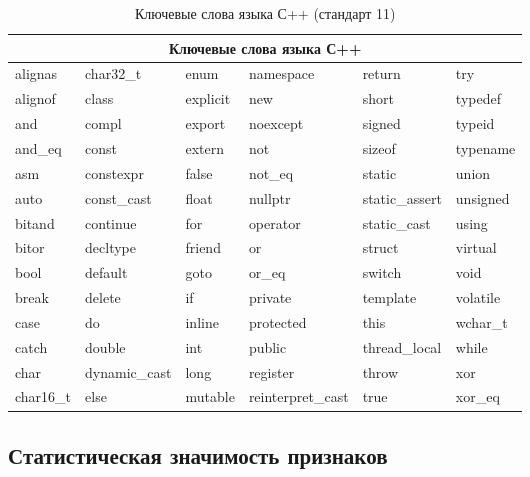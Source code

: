 \begin{table}[ht]
\caption{ Ключевые слова языка С++ (стандарт 11) }
\label{tab:3}
\begin{center}
\begin{tabularx}{\linewidth}{|X|X|X|X|X|X|}
\hline
\multicolumn{6}{|c|}{Ключевые слова языка С++} \\
\hline
alignas & char32\_t & enum & namespace & return & try\\
alignof & class & explicit & new & short & typedef\\
and & compl & export & noexcept & signed & typeid\\
and\_eq & const & extern & not & sizeof & typename\\
asm & constexpr & false & not\_eq & static & union\\
auto & const\_cast & float & nullptr & static\_assert & unsigned\\
bitand & continue & for & operator & static\_cast & using\\
bitor & decltype & friend & or & struct & virtual\\
bool & default & goto & or\_eq & switch & void\\
break & delete & if & private & template & volatile\\
case & do & inline & protected & this & wchar\_t\\
catch & double & int & public & thread\_local & while\\
char & dynamic\_cast & long & register & throw & xor\\
char16\_t & else & mutable & reinterpret\_cast & true & xor\_eq\\
\hline
\end{tabularx}
\end{center}
\end{table}

\subsection{Статистическая значимость признаков}
